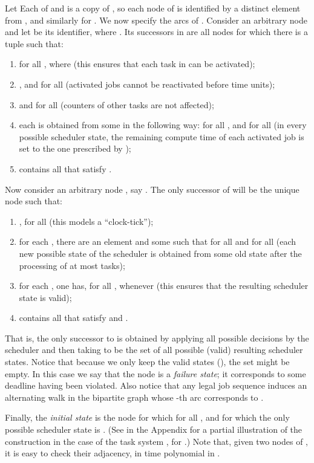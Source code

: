\documentclass{llncs}
\begin{document}
Let  Each of  and  is a copy of , so each node of  is identified by a distinct element from , and similarly for . 
We now specify the arcs of . Consider an arbitrary node  and let  be its identifier, where . Its successors in  are all nodes  for which there is a tuple  such that: 
\begin{enumerate}
\item  for all , where  (this ensures that each task in  can be activated); 
\item , and  for all  (activated jobs cannot be reactivated before  time units); 
\item  and  for all  (counters of other tasks are not affected); 
\item \label{cond:complete1} each  is obtained from some  in the following way:  for all , and  for all  (in every possible scheduler state, the remaining compute time of each activated job is set to the one prescribed by );    
\item  contains all  that satisfy .    
\end{enumerate}
Now consider an arbitrary node , say . The only successor of  will be the unique node  such that: 
\begin{enumerate}
\item ,  for all  (this models a ``clock-tick''); 
\item \label{cond:complete2} for each , there are an element  and some  such that  for all  and  for all  (each new possible state of the scheduler is obtained from some old state after the processing of at most  tasks); 
\item \label{cond:complete3}
 for each , one has, for all ,  whenever  (this ensures that the resulting scheduler state is valid); 
\item  contains all  that satisfy  and . 
\end{enumerate}
That is, the only successor to  is obtained by applying all possible decisions by the scheduler and then taking  to be the set of all possible (valid) resulting scheduler states. Notice that because we only keep the valid states (), the set  might be empty. In this case we say that the node  is a \emph{failure state}; it corresponds to some deadline having been violated. Also notice that any legal job sequence  induces an alternating walk in the bipartite graph  whose -th arc corresponds to .    

Finally, the \emph{initial state} is the node  for which  for all , and for which the only possible scheduler state is \zero. (See  in the Appendix for a partial illustration of the construction in the case of the task system , for .) Note that, given two nodes of , it is easy to check their adjacency, in time polynomial in . 
\end{document}
